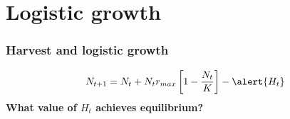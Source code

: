 \documentclass[color=usenames,dvipsnames]{beamer}\usepackage[]{graphicx}\usepackage[]{color}
\begin{document}
\section{Logistic growth}







\begin{frame}
  \frametitle{Harvest and logistic growth}
  \LARGE
  \[
    N_{t+1} = N_t + N_t r_{max}\left[1 - \frac{N_t}{K} \right] - \alert{H_t}
  \]
  \pause
  \vfill
  \Large
  \centering \bf What value of $H_t$ achieves equilibrium? \par %
\end{frame}
\end{document}
